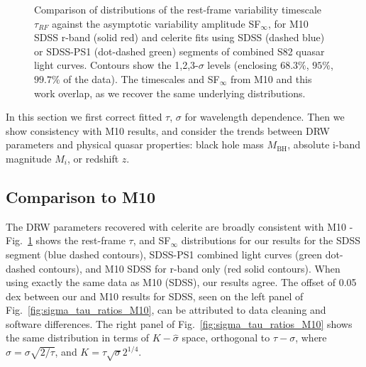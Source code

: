 \documentclass[twocolumn]{aastex62}
\newcommand{\project}[1]{\textsf{#1}}
\begin{document}
\begin{figure} 
	\caption{Comparison of distributions of the rest-frame variability timescale $\tau_{RF}$ against the  asymptotic variability amplitude SF$_{\infty}$, for M10 SDSS r-band (solid red)  and \project{celerite} fits using  SDSS (dashed blue) or SDSS-PS1 (dot-dashed green) segments of combined S82 quasar light curves. Contours show the 1,2,3-$\sigma$ levels (enclosing $68.3\%$, $95\%$, $99.7\%$ of the data). The timescales and SF$_{\infty}$ from M10 and this work overlap, as we recover the same underlying distributions. }
	\label{fig:tau_sf_dist}
\end{figure} 


In this section we first correct fitted $\tau$, $\sigma$ for wavelength dependence. Then we show consistency with M10 results,  and consider the trends between DRW parameters and physical quasar properties: black hole mass $M_{\mathrm{BH}}$, absolute i-band  magnitude $M_{i}$, or redshift $z$.  


\subsection{Comparison to M10}
The DRW parameters recovered with \project{celerite} are  broadly consistent with M10 - Fig.~\ref{fig:tau_sf_dist} shows the rest-frame  $\tau$, and SF$_{\infty}$ distributions for our results for the SDSS segment (blue dashed contours),  SDSS-PS1 combined light curves (green dot-dashed contours), and  M10 SDSS for r-band only (red solid contours). When using exactly the same data as M10 (SDSS), our results agree. The offset of 0.05 dex  between our and M10 results for SDSS, seen on the left panel of Fig.~\ref{fig:sigma_tau_ratios_M10}, can be attributed to data cleaning and software differences. The right panel of Fig.~\ref{fig:sigma_tau_ratios_M10} shows the same distribution in terms of $K-\hat{\sigma}$ space, orthogonal to $\tau-\sigma$, where $\hat{\sigma} = \sigma\sqrt{2 / \tau}$, and $K = \tau \sqrt{\sigma} 2^{1/4} $. 


\begin{figure*}
	\caption{Comparison of \project{celerite} fits using only the  SDSS r-band segments of S82 quasars ($\sigma_{\mathrm{SDSS}}, \tau_{\mathrm{SDSS}}$), against M10 results for SDSS r-band ($\sigma_{M10}, \tau_{M10}$), object-by-object. Note that for each ratio the median-based bias (lower-left corner) is calculated before taking the logarithm. The small offset ($<0.05 $ dex) can be attributed to data cleaning and software differences. See Fig.~\ref{fig:tau_sf_dist} for a comparison of rest-frame $\tau$ and SF$_{\infty}$ distributions. This is similar to Fig.3 in M10, except we plot only the r-band SDSS results. The right-hand panel shows the comparison in an orthogonal $K-\hat{\sigma}$  space, where $K$ is the direction along the diagonal on the left panel, and $\hat{\sigma}$-perpendicular to the diagonal. For this reason the right panel has a ten times smaller scatter along $\hat{\sigma}$ (0.037) than $K$ (0.358).} 
	\label{fig:sigma_tau_ratios_M10}
\end{figure*} 
\end{document}
